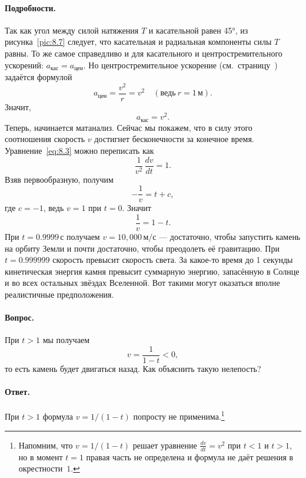 \paragraph{Подробности.}
Так как угол между силой натяжения $T$ и касательной равен 45°,
из рисунка~\ref{pic:8.7} следует, что касательная и радиальная компоненты силы $T$ равны.
То же самое справедливо и для касательного и центростремительного ускорений:
$a_{\text{кас}}=a_{\text{цен}}$.
Но центростремительное ускорение (см.~страницу~\pageref{sec:A.9}) задаётся формулой
\[
a_{\text{цен}}=\frac{v^2}{r}=v^2 \quad (\text{ведь}\  r=1\,\text{м}).
\]
Значит,
\begin{equation}
a_{\text{кас}}=v^2. \label{eq:8.3}
\end{equation}
Теперь, начинается матанализ.
Сейчас мы покажем, что в силу этого соотношения
скорость $v$ достигнет бесконечности за конечное время.
Уравнение~\eqref{eq:8.3} можно переписать как
\begin{equation}
\frac{1}{v^2}\,\frac{dv}{dt}=1. \label{eq:8.4}
\end{equation}
Взяв первообразную, получим
\[
-\frac{1}{v}=t + c,
\]
где $c=-1$, ведь $v=1$ при $t=0$.
Значит
\[
\frac{1}{v}=1 - t.
\]
При $t=0.9999 \,\text{с}$ получаем $v=10{,}000 \,\text{м/с}$ ---
достаточно, чтобы запустить камень на орбиту Земли и почти достаточно,
чтобы преодолеть её гравитацию.
При $t=0.999999$ скорость превысит скорость света.
За какое-то время до 1 секунды кинетическая энергия камня
превысит суммарную энергию, запасённую в Солнце и во всех остальных
звёздах Вселенной.
Вот такими могут оказаться вполне реалистичные предположения.

\paragraph{Вопрос.}
При $t > 1$ мы получаем
\[
v=\frac{1}{1 - t} < 0,
\]
то есть камень будет двигаться назад.
Как объяснить такую нелепость?

\paragraph{Ответ.}
При $t > 1$ формула $v=1/(1 - t)$ попросту не применима.\footnote{Напомним, что $v=1/(1 - t)$ решает уравнение $\tfrac{dv}{dt}=v^2$ при $t<1$ и $t>1$, но в момент $t=1$ правая часть не определена и формула не даёт решения в окрестности~$1$.}

